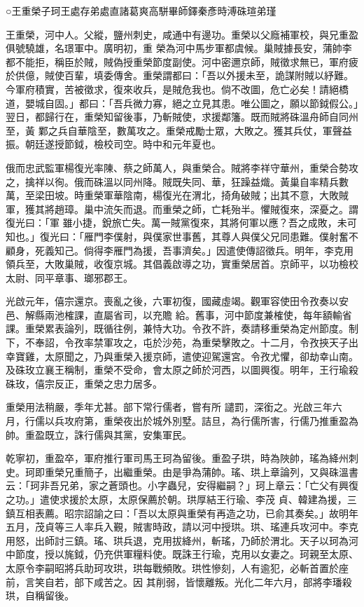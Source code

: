 
\begin{pinyinscope}

 ○王重榮子珂王處存弟處直諸葛爽高駢畢師鐸秦彥時溥硃瑄弟瑾



 王重榮，河中人。父縱，鹽州刺史，咸通中有邊功。重榮以父廕補軍校，與兄重盈俱號驍雄，名璟軍中。廣明初，重
 榮為河中馬步軍都虞候。巢賊據長安，蒲帥李都不能拒，稱臣於賊，賊偽授重榮節度副使。河中密邇京師，賊徵求無已，軍府疲於供億，賊使百輩，填委傳舍。重榮謂都曰：「吾以外援未至，詭謀附賊以紓難。今軍府積實，苦被徵求，復來收兵，是賊危我也。倘不改圖，危亡必矣！請絕橋道，嬰城自固。」都曰：「吾兵微力寡，絕之立見其患。唯公圖之，願以節鉞假公。」翌日，都歸行在，重榮知留後事，乃斬賊使，求援鄰籓。既而賊將硃溫舟師自同州至，黃
 鄴之兵自華陰至，數萬攻之。重榮戒勵士眾，大敗之。獲其兵仗，軍聲益振。朝廷遂授節鉞，檢校司空。時中和元年夏也。



 俄而忠武監軍楊復光率陳、蔡之師萬人，與重榮合。賊將李祥守華州，重榮合勢攻之，擒祥以徇。俄而硃溫以同州降。賊既失同、華，狂躁益熾。黃巢自率精兵數萬，至梁田坡。時重榮軍華陰南，楊復光在渭北，掎角破賊；出其不意，大敗賊軍，獲其將趙璋。巢中流矢而退。而重榮之師，亡耗殆半。懼賊復來，深憂之。謂復光曰：「軍
 雖小捷，銳旅亡失。萬一賊黨復來，其將何軍以應？吾之成敗，未可知也。」復光曰：「雁門李僕射，與僕家世事舊，其尊人與僕父兄同患難。僕射奮不顧身，死義知己。倘得李雁門為援，吾事濟矣。」因遣使傳詔徵兵。明年，李克用領兵至，大敗巢賊，收復京城。其倡義啟導之功，實重榮居首。京師平，以功檢校太尉、同平章事、瑯邪郡王。



 光啟元年，僖宗還京。喪亂之後，六軍初復，國藏虛竭。觀軍容使田令孜奏以安邑、解縣兩池榷課，直屬省司，以充贍
 給。舊事，河中節度兼榷使，每年額輸省課。重榮累表論列，既循往例，兼恃大功。令孜不許，奏請移重榮為定州節度。制下，不奉詔，令孜率禁軍攻之，屯於沙苑，為重榮擊敗之。十二月，令孜挾天子出幸寶雞，太原聞之，乃與重榮入援京師，遣使迎駕還宮。令孜尤懼，卻劫幸山南。及硃玫立襄王稱制，重榮不受命，會太原之師於河西，以圖興復。明年，王行瑜殺硃玫，僖宗反正，重榮之忠力居多。



 重榮用法稍嚴，季年尤甚。部下常行儒者，嘗有所
 譴罰，深銜之。光啟三年六月，行儒以兵攻府第，重榮夜出於城外別墅。詰旦，為行儒所害，行儒乃推重盈為帥。重盈既立，誅行儒與其黨，安集軍民。



 乾寧初，重盈卒，軍府推行軍司馬王珂為留後。重盈子珙，時為陜帥，瑤為絳州刺史。珂即重榮兄重簡子，出繼重榮。由是爭為蒲帥。瑤、珙上章論列，又與硃溫書云：「珂非吾兄弟，家之蒼頭也。小字蟲兒，安得繼嗣？」珂上章云：「亡父有興復之功。」遣使求援於太原，太原保薦於朝。珙厚結王行瑜、李茂
 貞、韓建為援，三鎮互相表薦。昭宗詔諭之曰：「吾以太原與重榮有再造之功，已俞其奏矣。」故明年五月，茂貞等三人率兵入覲，賊害時政，請以河中授珙。珙、瑤連兵攻河中。李克用怒，出師討三鎮。瑤、珙兵退，克用拔絳州，斬瑤，乃師於渭北。天子以珂為河中節度，授以旄鉞，仍充供軍糧料使。既誅王行瑜，克用以女妻之。珂親至太原、太原令李嗣昭將兵助珂攻珙，珙每戰頻敗。珙性慘刻，人有逾犯，必斬首置於座前，言笑自若，部下咸苦之。因
 其削弱，皆懷離叛。光化二年六月，部將李璠殺珙，自稱留後。




\end{pinyinscope}
